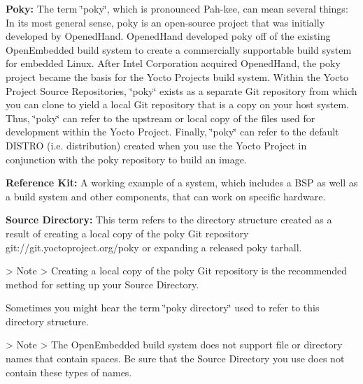 \begin{DoxyItemize}
\item {\bfseries Poky\+:} The term \char`\"{}poky\char`\"{}, which is pronounced Pah-\/kee, can mean several things\+: In its most general sense, poky is an open-\/source project that was initially developed by Opened\+Hand. Opened\+Hand developed poky off of the existing Open\+Embedded build system to create a commercially supportable build system for embedded Linux. After Intel Corporation acquired Opened\+Hand, the poky project became the basis for the Yocto Project\textquotesingle{}s build system. Within the Yocto Project Source Repositories, \char`\"{}poky\char`\"{} exists as a separate Git repository from which you can clone to yield a local Git repository that is a copy on your host system. Thus, \char`\"{}poky\char`\"{} can refer to the upstream or local copy of the files used for development within the Yocto Project. Finally, \char`\"{}poky\char`\"{} can refer to the default D\+I\+S\+T\+RO (i.\+e. distribution) created when you use the Yocto Project in conjunction with the poky repository to build an image.
\item {\bfseries Reference Kit\+:} A working example of a system, which includes a B\+SP as well as a build system and other components, that can work on specific hardware.
\item {\bfseries Source Directory\+:} This term refers to the directory structure created as a result of creating a local copy of the poky Git repository git\+://git.yoctoproject.\+org/poky or expanding a released poky tarball. \begin{DoxyVerb}>   Note
>   Creating a local copy of the poky Git repository is the recommended method for setting up your Source Directory. 
\end{DoxyVerb}


Sometimes you might hear the term \char`\"{}poky directory\char`\"{} used to refer to this directory structure. \begin{DoxyVerb}>   Note
>   The OpenEmbedded build system does not support file or directory names that contain spaces. Be sure that the Source Directory you use does not contain these types of names. 
\end{DoxyVerb}



\end{DoxyItemize}
